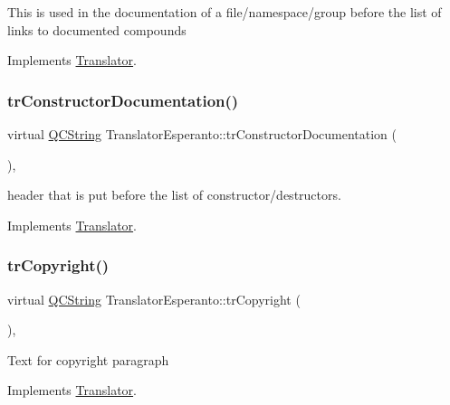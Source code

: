 This is used in the documentation of a file/namespace/group before the list of links to documented compounds 

Implements \mbox{\hyperlink{class_translator}{Translator}}.

\mbox{\label{class_translator_esperanto_a20b10c355271089e3e01bb835348b26a}} 
\subsubsection{\texorpdfstring{trConstructorDocumentation()}{trConstructorDocumentation()}}
{\footnotesize\ttfamily virtual \mbox{\hyperlink{class_q_c_string}{Q\+C\+String}} Translator\+Esperanto\+::tr\+Constructor\+Documentation (\begin{DoxyParamCaption}{ }\end{DoxyParamCaption})\hspace{0.3cm}{\ttfamily [inline]}, {\ttfamily [virtual]}}

header that is put before the list of constructor/destructors. 

Implements \mbox{\hyperlink{class_translator}{Translator}}.

\mbox{\label{class_translator_esperanto_a624058f0eadff71121dfe7792878c736}} 
\subsubsection{\texorpdfstring{trCopyright()}{trCopyright()}}
{\footnotesize\ttfamily virtual \mbox{\hyperlink{class_q_c_string}{Q\+C\+String}} Translator\+Esperanto\+::tr\+Copyright (\begin{DoxyParamCaption}{ }\end{DoxyParamCaption})\hspace{0.3cm}{\ttfamily [inline]}, {\ttfamily [virtual]}}

Text for copyright paragraph 

Implements \mbox{\hyperlink{class_translator}{Translator}}.

\mbox{\label{class_translator_esperanto_a8586ba9bf80b0952286207eedde6b28a}} 
